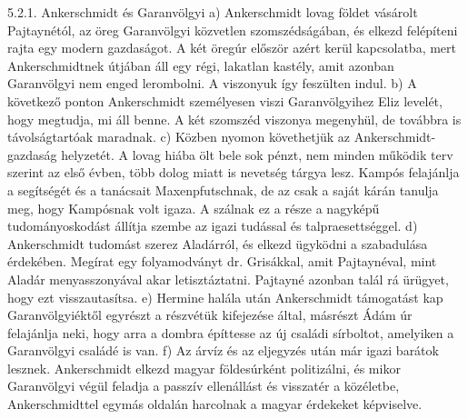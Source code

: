 \documentclass[a4paper,12pt]{thesis-ekf}
\begin{document}
    5.2.1. Ankerschmidt és Garanvölgyi
    a) Ankerschmidt lovag földet vásárolt Pajtaynétól, az öreg Garanvölgyi közvetlen szomszédságában, és elkezd felépíteni rajta egy modern gazdaságot. A két öregúr először azért kerül kapcsolatba, mert Ankerschmidtnek útjában áll egy régi, lakatlan kastély, amit azonban Garanvölgyi nem enged lerombolni. A viszonyuk így feszülten indul.
    b) A következő ponton Ankerschmidt személyesen viszi Garanvölgyihez Eliz levelét, hogy megtudja, mi áll benne. A két szomszéd viszonya megenyhül, de továbbra is távolságtartóak maradnak.
    c) Közben nyomon követhetjük az Ankerschmidt-gazdaság helyzetét. A lovag hiába ölt bele sok pénzt, nem minden működik terv szerint az első évben, több dolog miatt is nevetség tárgya lesz. Kampós felajánlja a segítségét és a tanácsait Maxenpfutschnak, de az csak a saját kárán tanulja meg, hogy Kampósnak volt igaza. A szálnak ez a része a nagyképű tudományoskodást állítja szembe az igazi tudással és talpraesettséggel.
    d) Ankerschmidt tudomást szerez Aladárról, és elkezd ügyködni a szabadulása érdekében. Megírat egy folyamodványt dr. Grisákkal, amit Pajtaynéval, mint Aladár menyasszonyával akar letisztáztatni. Pajtayné azonban talál rá ürügyet, hogy ezt visszautasítsa.
    e) Hermine halála után Ankerschmidt támogatást kap Garanvölgyiéktől egyrészt a részvétük kifejezése által, másrészt Ádám úr felajánlja neki, hogy arra a dombra építtesse az új családi sírboltot, amelyiken a Garanvölgyi családé is van.
    f) Az árvíz és az eljegyzés után már igazi barátok lesznek. Ankerschmidt elkezd magyar földesúrként politizálni, és mikor Garanvölgyi végül feladja a passzív ellenállást és visszatér a közéletbe, Ankerschmidttel egymás oldalán harcolnak a magyar érdekeket képviselve.
\end{document}
